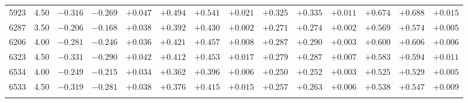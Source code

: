 \documentclass[]{aa}
\begin{document}
\begin{appendix}
\begin{table*}
\begin{center}
\begin{tabular}{llllllllllllll}
5923  &4.50& $ -0.316$&$  -0.269$&$  +0.047$&$  +0.494$&$  +0.541$&$  +0.021$&$  +0.325$&$  +0.335$&$  +0.011$&$  +0.674$&$  +0.688$&$  +0.015$\\
6287  &3.50& $ -0.206$&$  -0.168$&$  +0.038$&$  +0.392$&$  +0.430$&$  +0.002$&$  +0.271$&$  +0.274$&$  +0.002$&$  +0.569$&$  +0.574$&$  +0.005$\\
6206  &4.00& $ -0.281$&$  -0.246$&$  +0.036$&$  +0.421$&$  +0.457$&$  +0.008$&$  +0.287$&$  +0.290$&$  +0.003$&$  +0.600$&$  +0.606$&$  +0.006$\\
6323  &4.50& $ -0.331$&$  -0.290$&$  +0.042$&$  +0.412$&$  +0.453$&$  +0.017$&$  +0.279$&$  +0.287$&$  +0.007$&$  +0.583$&$  +0.594$&$  +0.011$\\
6534  &4.00& $ -0.249$&$  -0.215$&$  +0.034$&$  +0.362$&$  +0.396$&$  +0.006$&$  +0.250$&$  +0.252$&$  +0.003$&$  +0.525$&$  +0.529$&$  +0.005$\\
6533  &4.50& $ -0.319$&$  -0.281$&$  +0.038$&$  +0.376$&$  +0.415$&$  +0.015$&$  +0.257$&$  +0.263$&$  +0.006$&$  +0.538$&$  +0.547$&$  +0.009$\\
\hline\noalign{\smallskip}
\hline\noalign{\smallskip}
\end{tabular}
\end{center}
\end{table*}



\end{appendix}
\end{document}
